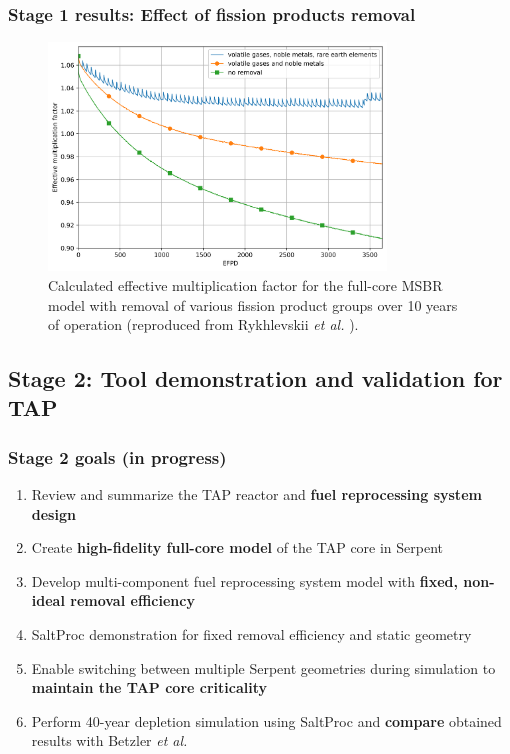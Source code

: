\begin{frame}
\frametitle{Stage 1 results: Effect of fission products removal}       

\begin{figure}[t] %
	\centering
	\includegraphics[width=0.8\textwidth]{../figures/keff_rem_cases.png} 
	\caption{Calculated effective multiplication factor for the full-core 
		\gls{MSBR} model with removal of various fission product groups over 
		10 	years of operation (reproduced from Rykhlevskii \emph{et al.} 
		\cite{rykhlevskii_modeling_2019}).}
\end{figure}

\end{frame}



\subsection{Stage 2: Tool demonstration and validation for \gls{TAP}}

\begin{frame}
\frametitle{Stage 2 goals (in progress)}
\begin{enumerate}
	\itemsep1em
	\item Review and summarize the \gls{TAP} reactor and \textbf{fuel 
	reprocessing system design}
	\item Create \textbf{high-fidelity full-core model} of the \gls{TAP} core 
	in Serpent
	\item Develop multi-component fuel reprocessing system model with 
	\textbf{fixed, non-ideal removal efficiency}
	\item SaltProc demonstration for fixed removal 
	efficiency and static geometry
	\item Enable switching between multiple Serpent
geometries during 
	simulation to \textbf{maintain the \gls{TAP} core criticality}
	\item Perform 40-year depletion simulation using SaltProc and 
	\textbf{compare} obtained results with Betzler \emph{et al.} 
	\cite{betzler_assessment_2017}
\end{enumerate}

\end{frame}

